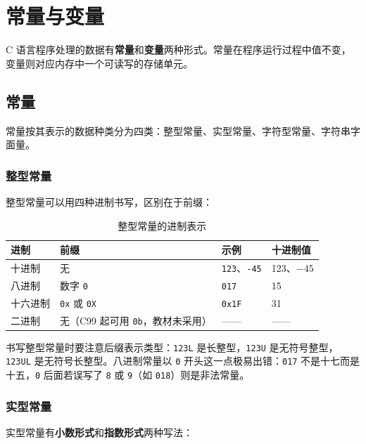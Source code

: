 ﻿%
\lstset{language=C}

\section{常量与变量}

C 语言程序处理的数据有\textbf{常量}和\textbf{变量}两种形式。常量在程序运行过程中值不变，变量则对应内存中一个可读写的存储单元。

\subsection{常量}

常量按其表示的数据种类分为四类：整型常量、实型常量、字符型常量、字符串字面量。

\subsubsection{整型常量}

整型常量可以用四种进制书写，区别在于前缀：

\begin{table}[htbp]
\centering
\caption{整型常量的进制表示}
\small
\begin{tabularx}{\textwidth}{@{}llXl@{}}
\toprule
进制 & 前缀 & 示例 & 十进制值 \\
\midrule
十进制 & 无 & \texttt{123}、\texttt{-45} & 123、$-45$ \\
八进制 & 数字 \texttt{0} & \texttt{017} & 15 \\
十六进制 & \texttt{0x} 或 \texttt{0X} & \texttt{0x1F} & 31 \\
二进制 & 无（C99 起可用 \texttt{0b}，教材未采用） & —— & —— \\
\bottomrule
\end{tabularx}
\end{table}

书写整型常量时要注意后缀表示类型：\texttt{123L} 是长整型，\texttt{123U} 是无符号整型，\texttt{123UL} 是无符号长整型。八进制常量以 \texttt{0} 开头这一点极易出错：\texttt{017} 不是十七而是十五，\texttt{0} 后面若误写了 \texttt{8} 或 \texttt{9}（如 \texttt{018}）则是非法常量。

\subsubsection{实型常量}

实型常量有\textbf{小数形式}和\textbf{指数形式}两种写法：

